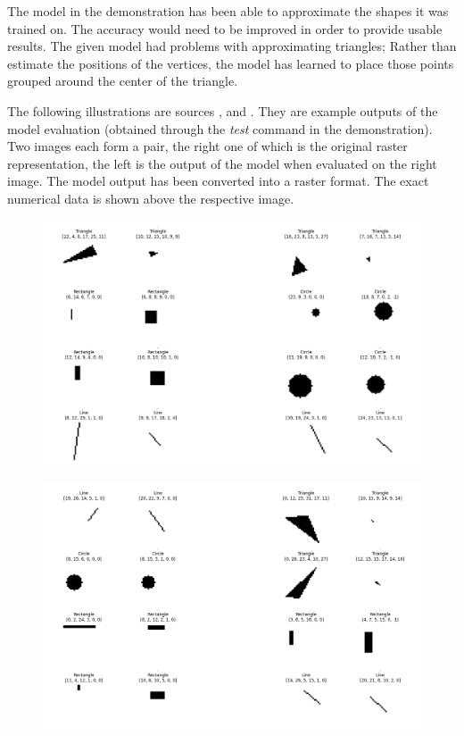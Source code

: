 \documentclass[12pt, a4paper, titlepage]{report}
\begin{document}
The model in the demonstration has been able to approximate the shapes it was trained on. The accuracy would need to be improved in order to provide usable results. The given model had problems with approximating triangles; Rather than estimate the positions of the vertices, the model has learned to place those points grouped around the center of the triangle.

The following illustrations are sources \cite{results_demonstration1}, \cite{results_demonstration2} and \cite{results_demonstration3} . They are example outputs of the model evaluation (obtained through the \emph{test} command in the demonstration). Two images each form a pair, the right one of which is the original raster representation, the left is the output of the model when evaluated on the right image. The model output has been converted into a raster format. The exact numerical data is shown above the respective image.

\begin{figure}[h]
   \includegraphics[width=1.0\textwidth]{../rc/images/all_shapes_approx_visual1.png}
   \label{fig:results_demonstration1}
\end{figure}

\begin{figure}[h]
   \includegraphics[width=1.0\textwidth]{../rc/images/all_shapes_approx_visual2.png}
   \label{fig:results_demonstration2}
\end{figure}
\end{document}

